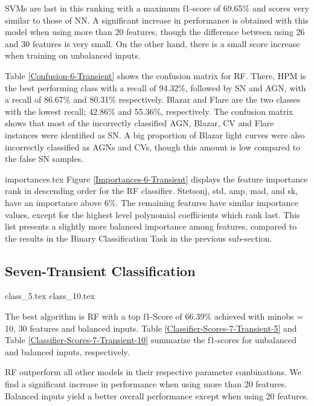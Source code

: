 \documentclass[a4paper,fleqn,usenatbib]{mnras}
\begin{document}
SVMs are last in this ranking with a maximum f1-score of 69.65\% and
scores very similar to those of NN. 
A significant increase in performance is obtained with this model when
using more than 20 features, though the difference between using 26
and 30 features is very small. 
On the other hand, there is a small score increase when training
on unbalanced inputs.

Table \ref{Confusion-6-Transient} shows the confusion matrix for RF. 
There, HPM is the best performing class with a recall of 94.32\%, 
followed by SN and AGN, with a recall of 86.67\% and 80.31\%
respectively. 
Blazar and Flare are the two classes with the lowest recall; 42.86\%
and 55.36\%, respectively. 
The confusion matrix shows that most of the incorrectly
classified AGN, Blazar, CV and Flare instances were identified as
SN. A big proportion of Blazar light curves were also incorrectly
classified as AGNs and CVs, though this amount is low compared to the
false SN samples. 


{importances.tex} Figure
\ref{Importances-6-Transient} displays the feature importance rank in
descending order for the RF classifier.
Stetson\textunderscore j, std, amp, mad, and sk, have an importance above 6\%. 
The remaining features have similar importance values, except
for the highest level polynomial coefficients which rank last.
This list presents a slightly more balanced importance among features,
compared to the results in the Binary Classification Task in the
previous sub-section.


\subsection{Seven-Transient Classification}

{class_5.tex}
{class_10.tex}

The best algorithm is RF with a top f1-Score of 66.39\% achieved with 
min\textunderscore obs = 10, 30 features and balanced inputs.
Table \ref{Classifier-Scores-7-Transient-5} and Table
\ref{Classifier-Scores-7-Transient-10} summarize the f1-scores
for unbalanced and balanced inputs, respectively. 

RF outperform all other models in their respective parameter
combinations. 
We find a significant increase in performance when using more than 20
features. 
Balanced inputs yield a better overall performance except when using 20 
features. 
\end{document}
